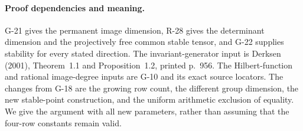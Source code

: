 \paragraph{Proof dependencies and meaning.}
G-21 gives the permanent image dimension, R-28 gives the
determinant dimension and the projectively free common stable
tensor, and G-22 supplies stability for every stated direction.
The invariant-generator input is Derksen (2001), Theorem~1.1
and Proposition~1.2, printed p.~956. The Hilbert-function and
rational image-degree inputs are G-10 and its exact source
locators. The changes from G-18 are the growing row count,
the different group dimension, the new stable-point construction,
and the uniform arithmetic exclusion of equality. We give the
argument with all new parameters, rather than assuming that
the four-row constants remain valid.


